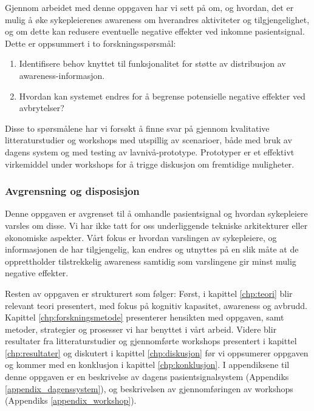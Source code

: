 \noindent
Gjennom arbeidet med denne oppgaven har vi sett på om, og hvordan, det er mulig å øke sykepleierenes awareness om hverandres aktiviteter og tilgjengelighet, og om dette kan redusere eventuelle negative effekter ved inkomne pasientsignal. Dette er oppsummert i to forskningsspørsmål:

\begin{enumerate}
  \item Identifisere behov knyttet til funksjonalitet for støtte av distribusjon av awareness-informasjon.
  \item Hvordan kan systemet endres for å begrense potensielle negative effekter ved avbrytelser?
\end{enumerate}

\noindent
Disse to spørsmålene har vi forsøkt å finne svar på gjennom kvalitative litteraturstudier og workshops med utspillig av scenarioer, både med bruk av dagens system og med testing av lavnivå-prototype. Prototyper er et effektivt virkemiddel under workshops for å trigge diskusjon om fremtidige muligheter. 

\subsubsection{Avgrensning og disposisjon}
Denne oppgaven er avgrenset til å omhandle pasientsignal og hvordan sykepleiere varsles om disse. Vi har ikke tatt for oss underliggende tekniske arkitekturer eller økonomiske aspekter. Vårt fokus er hvordan varslingen av sykepleiere, og informasjonen de har tilgjengelig, kan endres og utnyttes på en slik måte at de opprettholder tilstrekkelig awareness samtidig som varslingene gir minst mulig negative effekter.

\noindent
Resten av oppgaven er strukturert som følger: Først, i kapittel \ref{chp:teori} blir relevant teori presentert, med fokus på kognitiv kapasitet, awareness og avbrudd. Kapittel \ref{chp:forskningsmetode} presenterer hensikten med oppgaven, samt metoder, strategier og prosesser vi har benyttet i vårt arbeid. Videre blir resultater fra litteraturstudier og gjennomførte workshops presentert i kapittel \ref{chp:resultater} og diskutert i kapittel \ref{chp:diskusjon} før vi oppsumerer oppgaven og kommer med en konklusjon i kapittel \ref{chp:konklusjon}. I appendiksene til denne oppgaven er en beskrivelse av dagens pasientsignalsystem (Appendiks \ref{appendix_dagenssystem}), og beskrivelsen av gjennomføringen av workshops (Appendiks \ref{appendix_workshop}).